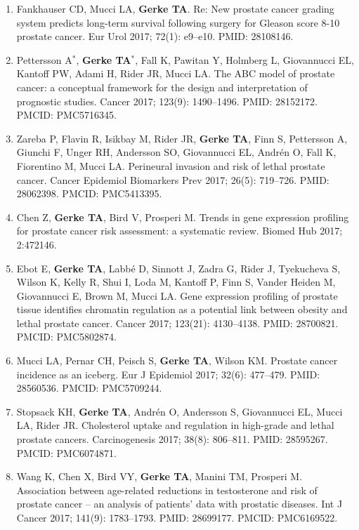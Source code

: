 \documentclass[11pt, a4paper]{article} %
\begin{document}
\begin{enumerate}[leftmargin=*]
\item{} Fankhauser CD, Mucci LA, {\bf Gerke TA}. Re: New prostate cancer grading system predicts long-term survival following surgery for Gleason score 8-10 prostate cancer. Eur Urol 2017; 72(1): e9--e10. PMID: 28108146.

\item{} Pettersson A$^*$, {\bf Gerke TA$^*$}, Fall K, Pawitan Y, Holmberg L, Giovannucci EL, Kantoff PW, Adami H, Rider JR, Mucci LA. The ABC model of prostate cancer: a conceptual framework for the design and interpretation of prognostic studies. Cancer 2017; 123(9): 1490--1496. PMID: 28152172. PMCID: PMC5716345. 

\item{}  Zareba P, Flavin R, Isikbay M, Rider JR, {\bf Gerke TA}, Finn S, Pettersson A, Giunchi F, Unger RH, Andersson SO, Giovannucci EL, Andr\'{e}n O, Fall K, Fiorentino M, Mucci LA. Perineural invasion and risk of lethal prostate cancer. Cancer Epidemiol Biomarkers Prev 2017; 26(5): 719--726. PMID: 28062398. PMCID: PMC5413395.

\item{} Chen Z, {\bf Gerke TA}, Bird V, Prosperi M. Trends in gene expression profiling for prostate cancer risk assessment: a systematic review. Biomed Hub 2017; 2:472146.

\item{} Ebot E, {\bf Gerke TA},  Labb\'{e} D, Sinnott J, Zadra G, Rider J, Tyekucheva S, Wilson K, Kelly R, Shui I, Loda M, Kantoff P, Finn S, Vander Heiden M, Giovannucci E, Brown M, Mucci LA. Gene expression profiling of prostate tissue identifies chromatin regulation as a potential link between obesity and lethal prostate cancer. Cancer 2017; 123(21): 4130--4138. PMID: 28700821. PMCID: PMC5802874.

\item{} Mucci LA, Pernar CH, Peisch S, {\bf Gerke TA}, Wilson KM. Prostate cancer incidence as an iceberg. Eur J Epidemiol 2017; 32(6): 477--479. PMID: 28560536. PMCID: PMC5709244. 

\item{} Stopsack KH, {\bf Gerke TA}, Andr\'{e}n O, Andersson S, Giovannucci EL, Mucci LA, Rider JR. Cholesterol uptake and regulation in high-grade and lethal prostate cancers. Carcinogenesis 2017; 38(8): 806--811. PMID: 28595267. PMCID: PMC6074871.

\item{} Wang K, Chen X, Bird VY, {\bf Gerke TA}, Manini TM, Prosperi M. Association between age-related reductions in testosterone and risk of prostate cancer -- an analysis of patients' data with prostatic diseases. Int J Cancer 2017; 141(9): 1783--1793. PMID: 28699177. PMCID: PMC6169522.


\end{enumerate}
\end{document}
